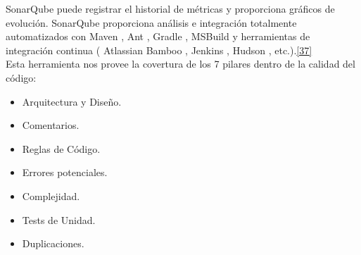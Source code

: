 SonarQube puede registrar el historial de métricas y proporciona gráficos de evolución. SonarQube proporciona análisis e integración totalmente automatizados con Maven , Ant , Gradle , MSBuild y herramientas de integración continua ( Atlassian Bamboo , Jenkins , Hudson , etc.).\hyperlink{b37}{[37]}\\

Esta herramienta nos provee la covertura de los 7 pilares dentro de la calidad del código:

\begin{itemize}
	\item Arquitectura y Diseño.
	\item Comentarios.
	\item Reglas de Código.
	\item Errores potenciales.
	\item Complejidad.
	\item Tests de Unidad.
	\item Duplicaciones.
\end{itemize}






